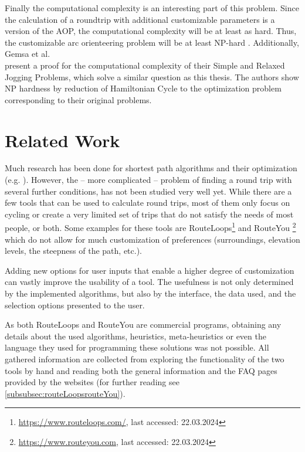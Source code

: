 Finally the computational complexity is an interesting part of this problem. 
Since the calculation of a roundtrip with additional customizable parameters is a version of the AOP, the computational complexity will be at least as hard.
Thus, the customizable arc orienteering problem will be at least NP-hard \cite{agarwal_correlated_2023}.
Additionally, Gemsa et al.\\ \cite{gemsa_efficient_2013} present a proof for the computational complexity of their Simple and Relaxed Jogging Problems, which solve a similar question as this thesis.
The authors show NP hardness by reduction of Hamiltonian Cycle to the optimization problem corresponding to their original problems.






\section{Related Work}
\label{sec:relatedWork}


Much research has been done for shortest path algorithms and their optimization (e.g. \cite{cherkassky_shortest_1996, deo_shortest-path_1984, gallo_shortest_1988, madkour_survey_2017, sommer_shortest-path_2014, wayahdi_greedy_2021}).
However, the -- more complicated \cite{gemsa_efficient_2013} -- problem of finding a round trip with several further conditions, has not been studied very well yet.
While there are a few tools that can be used to calculate round trips, most of them only focus on cycling or create a very limited set of trips that do not satisfy the needs of most people, or both. 
Some examples for these tools are RouteLoops\footnote{\url{https://www.routeloops.com/}, last accessed: 22.03.2024} and RouteYou \footnote{\url{https://www.routeyou.com}, last accessed: 22.03.2024} which do not allow for much customization of preferences (surroundings, elevation levels, the steepness of the path, etc.). 

Adding new options for user inputs that enable a higher degree of customization can vastly improve the usability of a tool. 
The usefulness is not only determined by the implemented algorithms, but also by the interface, the data used, and the selection options presented to the user. 

As both RouteLoops and RouteYou are commercial programs, obtaining any details about the used algorithms, heuristics, meta-heuristics or even the language they used for programming these solutions was not possible.
All gathered information are collected from exploring the functionality of the two tools by hand and reading both the general information and the FAQ pages provided by the websites (for further reading see \ref{subsubsec:routeLoopsrouteYou}). 

